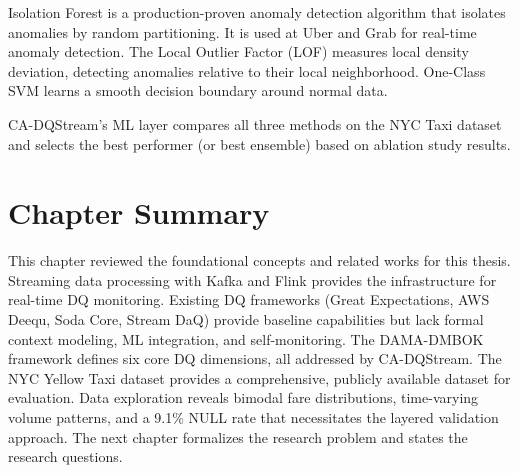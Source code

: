 Isolation Forest \citep{liu2008isolation} is a production-proven anomaly detection algorithm that isolates anomalies by random partitioning. It is used at Uber and Grab for real-time anomaly detection. The Local Outlier Factor (LOF) \citep{breunig2000lof} measures local density deviation, detecting anomalies relative to their local neighborhood. One-Class SVM \citep{scholkopf2001oc} learns a smooth decision boundary around normal data.

CA-DQStream's ML layer compares all three methods on the NYC Taxi dataset and selects the best performer (or best ensemble) based on ablation study results.

\section{Chapter Summary}

This chapter reviewed the foundational concepts and related works for this thesis. Streaming data processing with Kafka and Flink provides the infrastructure for real-time DQ monitoring. Existing DQ frameworks (Great Expectations, AWS Deequ, Soda Core, Stream DaQ) provide baseline capabilities but lack formal context modeling, ML integration, and self-monitoring. The DAMA-DMBOK framework defines six core DQ dimensions, all addressed by CA-DQStream. The NYC Yellow Taxi dataset provides a comprehensive, publicly available dataset for evaluation. Data exploration reveals bimodal fare distributions, time-varying volume patterns, and a 9.1\% NULL rate that necessitates the layered validation approach. The next chapter formalizes the research problem and states the research questions.
